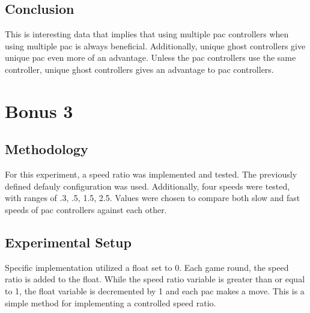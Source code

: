 \documentclass{article}
\begin{document}
\subsection{Conclusion}
\begin{flushleft}
This is interesting data that implies that using multiple pac controllers when
 using multiple pac is always beneficial. Additionally, unique ghost controllers
 give unique pac even more of an advantage. Unless the pac controllers use the
 same controller, unique ghost controllers gives an advantage to pac
 controllers.
\end{flushleft}

\clearpage

\section{Bonus 3}
\subsection{Methodology}
\begin{flushleft}
For this experiment, a speed ratio was implemented and tested. The previously
 defined defauly configuration was used. Additionally, four speeds were tested,
 with ranges of .3, .5, 1.5, 2.5. Values were chosen to compare both slow and
 fast speeds of pac controllers against each other.
\end{flushleft}
\subsection{Experimental Setup}
\begin{flushleft}
Specific implementation utilized a float set to 0. Each game round, the speed
 ratio is added to the float. While the speed ratio variable is greater than or
 equal to 1, the float variable is decremented by 1 and each pac makes a move.
 This is a simple method for implementing a controlled speed ratio.
\end{flushleft}
\end{document}
